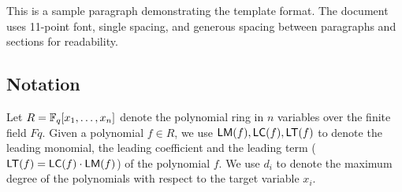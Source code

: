 This is a sample paragraph demonstrating the template format. 
The document uses 11-point font, single spacing, and generous
spacing between paragraphs and sections for readability.


\subsection{Notation}

Let \(R = \mathbb{F}_q[x_1, \dots, x_n]\) denote the polynomial ring in \(n\) variables over the finite field \(Fq\). Given a polynomial \(f \in R\), we use \(\mathsf{LM}(f), \mathsf{LC}(f), \mathsf{LT}(f)\) to denote the leading monomial, the leading coefficient and the leading term (\(\mathsf{LT}(f) = \mathsf{LC}(f)\cdot \mathsf{LM}(f)\)) of the polynomial \(f\). We use $d_i$ to denote the maximum degree of the polynomials with respect to the target variable $x_i$. 